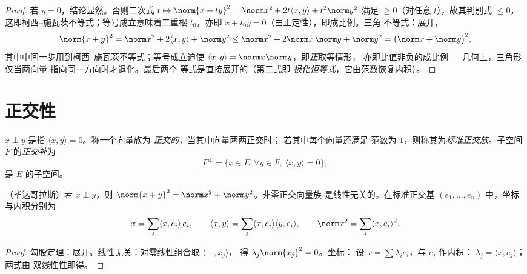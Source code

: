 \begin{proof}
若 $y = 0$，结论显然。否则二次式 $t
\mapsto \norm{x + ty}^2 = \norm x^2 + 2t\langle x, y\rangle + t^2
\norm y^2$ 满足 $\geq 0$（对任意 $t$），故其判别式 $\leq 0$，
这即柯西–施瓦茨不等式；等号成立意味着二重根 $t_0$，亦即
$x + t_0 y = 0$（由正定性），即成比例。三角
不等式：展开，
\[
\norm{x + y}^2 = \norm x^2 + 2\langle x, y\rangle + \norm y^2
\leq \norm x^2 + 2\norm x\,\norm y + \norm y^2
= \bigl(\norm x + \norm y\bigr)^2 ,
\]
其中中间一步用到柯西–施瓦茨不等式；等号成立迫使 $\langle
x, y\rangle = \norm x\norm y$，即\emph{正}取等情形，
亦即比值非负的成比例 ---
几何上，三角形仅当两向量
指向同一方向时才退化。最后两个
等式是直接展开的（第二式即
\emph{极化恒等式}，它由范数恢复内积）。
\end{proof}

\section{正交性}

\begin{definition}\label{def:b1:euclid:orthogonal}
$x \perp y$ 是指 $\langle x, y \rangle = 0$。称一个向量族为
\emph{正交的}，当其中向量两两正交时；
若其中每个向量还满足
范数为 $1$，则称其为\emph{标准正交族}。子空间 $F$ 的\emph{正交补}为
\[
F^{\perp} = \{x \in E : \forall y \in F,\ \langle x, y\rangle =
0\},
\]
是 $E$ 的子空间。
\end{definition}

\begin{proposition}\label{prop:b1:euclid:orthfree}
（毕达哥拉斯）若 $x \perp y$，则
$\norm{x+y}^2 = \norm x^2 + \norm y^2$。非零正交向量族
是线性无关的。在标准正交基 $(e_1, \dots,
e_n)$ 中，坐标与内积分别为
\[
x = \sum_{i} \langle x, e_i\rangle\, e_i,
\qquad
\langle x, y \rangle = \sum_i \langle x, e_i\rangle \langle y,
e_i\rangle,
\qquad
\norm x^2 = \sum_i \langle x, e_i\rangle^2 .
\]
\end{proposition}

\begin{proof}
勾股定理：展开。线性无关：对零线性组合取 $\langle\,\cdot\,, x_j\rangle$，
得 $\lambda_j \norm{x_j}^2 = 0$。坐标：
设 $x = \sum \lambda_i e_i$，与 $e_j$ 作内积：
$\lambda_j = \langle x, e_j\rangle$；两式由
双线性性即得。
\end{proof}

